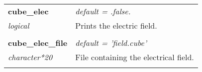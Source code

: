 \begin{Spacing}{1.0}
\begin{longtable}{ p{} p{} }
   \textbf{cube\_elec}
   &  \textit{default = .false. }
   \\*\textit{logical}
   & Prints the electric field.\\* \\

   \textbf{cube\_elec\_file}
   &  \textit{default = 'field.cube'}
   \\*\textit{character*20}
   & File containing the electrical field.\\* \\


\end{longtable}
\end{Spacing}
